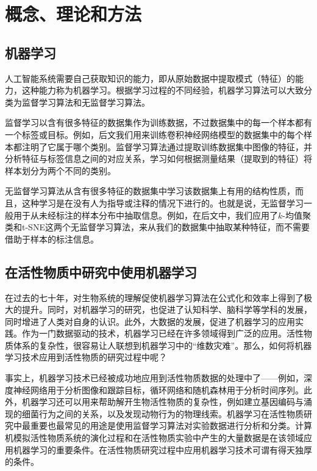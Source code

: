 \section{概念、理论和方法}
\subsection{机器学习}
人工智能系统需要自己获取知识的能力，即从原始数据中提取模式（特征）的能力，这种能力称为{\Heiti 机器学习}。根据学习过程的不同经验，机器学习算法可以大致分类为监督学习算法和无监督学习算法\cite{DL, 机器学习实战}。

监督学习以含有很多特征的数据集作为训练数据，不过数据集中的每一个样本都有一个{\Heiti 标签}或{\Heiti 目标}\cite{DL}。例如，后文我们用来训练卷积神经网络模型的数据集中的每个样本都注明了它属于哪个类别。监督学习算法通过提取训练数据集中图像的特征，并分析特征与标签信息之间的对应关系，学习如何根据测量结果（提取到的特征）将样本划分为两个不同的类别。

无监督学习算法从含有很多特征的数据集中学习该数据集上有用的结构性质，而且，这种学习是在没有人为指导或注释的情况下进行的。也就是说，无监督学习一般用于从未经标注的样本分布中抽取信息\cite{DL}。例如，在后文中，我们应用了$k$-均值聚类和t-SNE这两个无监督学习算法，来从我们的数据集中抽取某种特征，而不需要借助于样本的标注信息。

\subsection{在活性物质中研究中使用机器学习}
在过去的七十年，对生物系统的理解促使机器学习算法在公式化和效率上得到了极大的提升\cite{MLAM}。同时，对机器学习的研究，也促进了认知科学、脑科学等学科的发展，同时增进了人类对自身的认识\cite{DL}。此外，大数据的发展，促进了机器学习的应用实践。作为一门数据驱动的技术，机器学习已经在许多领域得到广泛的应用。活性物质体系的复杂性，很容易让人联想到机器学习中的“维数灾难”\cite{DL, MLPM}。那么，如何将机器学习技术应用到活性物质的研究过程中呢？

事实上，机器学习技术已经被成功地应用到活性物质数据的处理中了——例如，深度神经网络用于分析图像和跟踪目标，循环网络和随机森林用于分析时间序列。此外，机器学习还可以用来帮助解开生物活性物质的复杂性，例如建立基因编码与涌现的细菌行为之间的关系，以及发现动物行为的物理线索。机器学习在活性物质研究中最重要也最常见的用途是使用监督学习算法对实验数据进行分析和分类\cite{MLAM}。计算机模拟活性物质系统的演化过程和在活性物质实验中产生的大量数据是在该领域应用机器学习的重要条件。在活性物质研究过程中应用机器学习技术可谓有得天独厚的条件。

